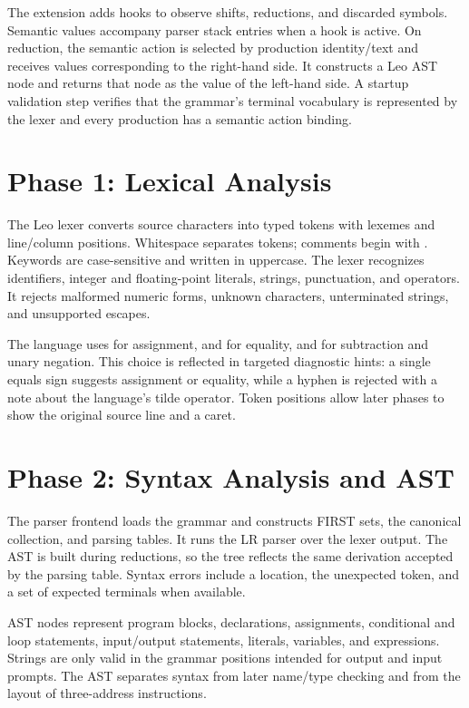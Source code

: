 \documentclass[12pt,a4paper,oneside]{report}
\newcommand{\code}[1]{\texttt{\detokenize{#1}}}
\begin{document}
The extension adds hooks to observe shifts, reductions, and discarded symbols. Semantic values accompany parser stack entries when a hook is active. On reduction, the semantic action is selected by production identity/text and receives values corresponding to the right-hand side. It constructs a Leo AST node and returns that node as the value of the left-hand side. A startup validation step verifies that the grammar's terminal vocabulary is represented by the lexer and every production has a semantic action binding.

\section{Phase 1: Lexical Analysis}
The Leo lexer converts source characters into typed tokens with lexemes and line/column positions. Whitespace separates tokens; comments begin with \code{#}. Keywords are case-sensitive and written in uppercase. The lexer recognizes identifiers, integer and floating-point literals, strings, punctuation, and operators. It rejects malformed numeric forms, unknown characters, unterminated strings, and unsupported escapes.

The language uses \code{<-} for assignment, \code{==} and \code{!=} for equality, and \code{~} for subtraction and unary negation. This choice is reflected in targeted diagnostic hints: a single equals sign suggests assignment or equality, while a hyphen is rejected with a note about the language's tilde operator. Token positions allow later phases to show the original source line and a caret.

\section{Phase 2: Syntax Analysis and AST}
The parser frontend loads the grammar and constructs FIRST sets, the canonical collection, and parsing tables. It runs the LR parser over the lexer output. The AST is built during reductions, so the tree reflects the same derivation accepted by the parsing table. Syntax errors include a location, the unexpected token, and a set of expected terminals when available.

AST nodes represent program blocks, declarations, assignments, conditional and loop statements, input/output statements, literals, variables, and expressions. Strings are only valid in the grammar positions intended for output and input prompts. The AST separates syntax from later name/type checking and from the layout of three-address instructions.
\end{document}
